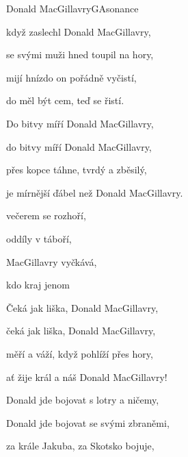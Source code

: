 \begin{song}{Donald MacGillavry}{G}{Asonance}

\begin{SBVerse}

 když zaslechl Donald MacGillavry,

se svými muži hned toupil na hory,

mijí hnízdo on pořádně vyčistí,

do měl být cem, teď  se řistí.

\end{SBVerse}

\begin{SBVerse}

Do bitvy míří Donald MacGillavry,

do bitvy míří Donald MacGillavry,

přes kopce táhne, tvrdý a zběsilý,

je mírnější ďábel než Donald MacGillavry.

\end{SBVerse}

\begin{SBVerse}

 večerem  se rozhoří,

 oddíly v  táboří,

 MacGillavry  vyčkává,

 kdo kraj  jenom  

\end{SBVerse}

\begin{SBVerse}

Čeká jak liška, Donald MacGillavry,

čeká jak liška, Donald MacGillavry,

měří a váží, když pohlíží přes hory,

ať žije král a náš Donald MacGillavry!

\end{SBVerse}

\begin{SBVerse}

Donald jde bojovat s lotry a ničemy,

Donald jde bojovat se svými zbraněmi,

za krále Jakuba, za Skotsko bojuje,


\end{SBVerse}
\end{song}
